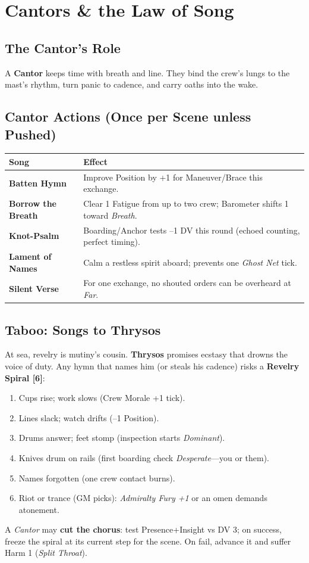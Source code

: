 \documentclass[11pt,oneside]{book}
\begin{document}
\section{Cantors \& the Law of Song}

\subsection*{The Cantor's Role}
A \textbf{Cantor} keeps time with breath and line. They bind the crew's lungs to the mast's rhythm, turn panic to cadence, and carry oaths into the wake.

\subsection*{Cantor Actions (Once per Scene unless Pushed)}
\begin{tabularx}{\linewidth}{@{}p{3.2cm} X@{}}
\toprule
\textbf{Song} & \textbf{Effect}\\
\midrule
\textbf{Batten Hymn} & Improve Position by +1 for Maneuver/Brace this exchange.\\
\textbf{Borrow the Breath} & Clear 1 Fatigue from up to two crew; Barometer shifts 1 toward \emph{Breath}.\\
\textbf{Knot-Psalm} & Boarding/Anchor tests --1 DV this round (echoed counting, perfect timing).\\
\textbf{Lament of Names} & Calm a restless spirit aboard; prevents one \emph{Ghost Net} tick.\\
\textbf{Silent Verse} & For one exchange, no shouted orders can be overheard at \emph{Far}.\\
\bottomrule
\end{tabularx}

\subsection*{Taboo: Songs to Thrysos}
At sea, revelry is mutiny's cousin. \textbf{Thrysos} promises ecstasy that drowns the voice of duty. Any hymn that names him (or steals his cadence) risks a \textbf{Revelry Spiral [6]}:
\begin{enumerate}[leftmargin=*,itemsep=1pt]
  \item Cups rise; work slows (Crew Morale +1 tick).
  \item Lines slack; watch drifts (--1 Position).
  \item Drums answer; feet stomp (inspection starts \emph{Dominant}).
  \item Knives drum on rails (first boarding check \emph{Desperate}---you or them).
  \item Names forgotten (one crew contact burns).
  \item Riot or trance (GM picks): \emph{Admiralty Fury +1} or an omen demands atonement.
\end{enumerate}
A \emph{Cantor} may \textbf{cut the chorus}: test Presence+Insight vs DV 3; on success, freeze the spiral at its current step for the scene. On fail, advance it and suffer Harm 1 (\emph{Split Throat}).
\end{document}
